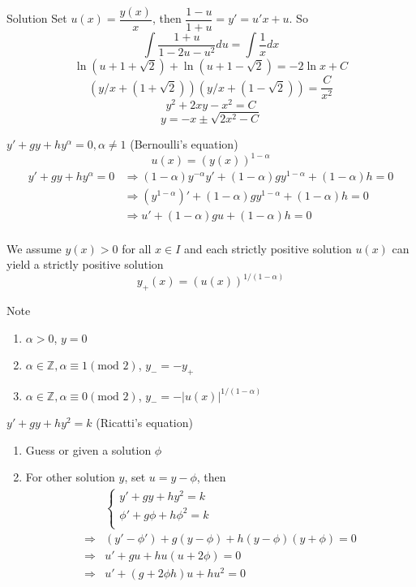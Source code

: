 \documentclass{beamer}
\begin{document}
\begin{frame}
\begin{block}{Solution}
Set $u(x)=\dfrac{y(x)}{x}$, then $\dfrac{1-u}{1+u}=y'=u'x+u$. So
$$\int \dfrac{1+u}{1-2u-u^2}du=\int \dfrac{1}{x}dx$$
$$\ln(u+1+\sqrt{2})+\ln(u+1-\sqrt{2})=-2\ln x+C$$
$$(y/x+(1+\sqrt{2}))(y/x+(1-\sqrt{2}))=\dfrac{C}{x^2}$$
$$y^2+2xy-x^2=C$$
$$y=-x\pm\sqrt{2x^2-C}$$
\end{block}
\end{frame}

\begin{frame}
\begin{block}{$y'+gy+hy^{\alpha}=0,\alpha\neq1$ (Bernoulli's equation)}
$$u(x)=(y(x))^{1-\alpha}$$
\begin{align*}
y'+gy+hy^\alpha=0&\Rightarrow (1-\alpha)y^{-\alpha}y'+(1-\alpha)gy^{1-\alpha}+(1-\alpha)h=0\\
&\Rightarrow (y^{1-\alpha})'+(1-\alpha)gy^{1-\alpha}+(1-\alpha)h=0\\
&\Rightarrow u'+(1-\alpha)gu+(1-\alpha)h=0\\
\end{align*}
\end{block}

\end{frame}

\begin{frame}
We assume $y(x)>0$ for all $x\in I$ and each strictly positive solution $u(x)$ can yield a strictly positive solution
$$y_+(x)=(u(x))^{1/(1-\alpha)}$$
\begin{block}{Note}
\begin{enumerate}
\item $\alpha>0$, $y=0$
\item $\alpha\in\mathbb{Z}, \alpha\equiv1(\text{mod 2})$, $y_-=-y_+$
\item $\alpha\in\mathbb{Z}, \alpha\equiv0(\text{mod 2})$, $y_-=-|u(x)|^{1/{(1-\alpha)}}$
\end{enumerate}
\end{block}
\end{frame}

\begin{frame}
\begin{block}{$y'+gy+hy^2=k$ (Ricatti's equation)}
\begin{enumerate}
\item Guess or given a solution $\phi$
\item For other solution $y$, set $u=y-\phi$, then
\begin{align*}
&\left\{
\begin{aligned}
y'+gy+hy^2=k\\
\phi'+g\phi+h\phi^2=k\\
\end{aligned}
\right.\\\Rightarrow & (y'-\phi')+g(y-\phi)+h(y-\phi)(y+\phi)=0\\
\Rightarrow&u'+gu+hu(u+2\phi)=0\\
\Rightarrow&u'+(g+2\phi h)u+hu^2=0
\end{align*}
\end{enumerate}
\end{block}
\end{frame}
\end{document}
